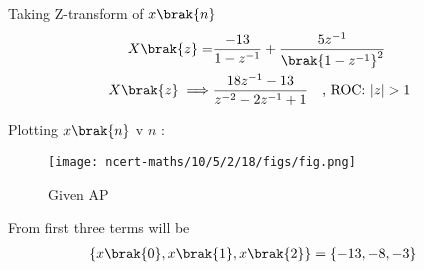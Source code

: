\documentclass[journal,12pt,twocolumn]{IEEEtran}
\begin{document}
Taking Z-transform of $x\brak{n}$
\begin{align}
X\brak{z} = & \frac{-13}{1 - z^{-1}} + \frac{ 5z^{-1}}{\brak{1 - z^{-1}}^2}\\
X\brak{z}\implies & \frac{18z^{-1} - 13}{z^{-2} - 2z^{-1} + 1} \quad \text{, ROC: } |z| > 1 
\end{align}

\pagebreak

Plotting $x\brak{n}$ v $n$ :
\begin{figure}[h]
    \texttt{[image: ncert-maths/10/5/2/18/figs/fig.png]}
    \caption{Given AP}
    \label{fig:10.5.2.18.1}
\end{figure}

From  first three terms will be
\begin{align}
\{x\brak{0},x\brak{1},x\brak{2}\} &= \{-13 , -8 , -3\}
\end{align}
\end{document}
